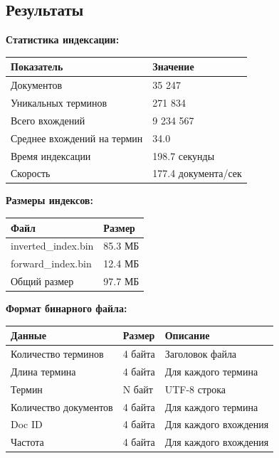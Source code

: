 \documentclass[a4paper, 12pt]{article}
\begin{document}
\subsection*{Результаты}
\textbf{Статистика индексации:}
\begin{table}[h]
\begin{tabular}{|l|l|}
\hline
\textbf{Показатель} & \textbf{Значение} \\ \hline
Документов & 35 247 \\ \hline
Уникальных терминов & 271 834 \\ \hline
Всего вхождений & 9 234 567 \\ \hline
Среднее вхождений на термин & 34.0 \\ \hline
Время индексации & 198.7 секунды \\ \hline
Скорость & 177.4 документа/сек \\ \hline
\end{tabular}
\end{table}

\textbf{Размеры индексов:}
\begin{table}[h]
\begin{tabular}{|l|l|}
\hline
\textbf{Файл} & \textbf{Размер} \\ \hline
inverted\_index.bin & 85.3 МБ \\ \hline
forward\_index.bin & 12.4 МБ \\ \hline
Общий размер & 97.7 МБ \\ \hline
\end{tabular}
\end{table}

\textbf{Формат бинарного файла:}
\begin{table}[h]
\begin{tabular}{|l|l|p{7cm}|}
\hline
\textbf{Данные} & \textbf{Размер} & \textbf{Описание} \\ \hline
Количество терминов & 4 байта & Заголовок файла \\ \hline
Длина термина & 4 байта & Для каждого термина \\ \hline
Термин & N байт & UTF-8 строка \\ \hline
Количество документов & 4 байта & Для каждого термина \\ \hline
Doc ID & 4 байта & Для каждого вхождения \\ \hline
Частота & 4 байта & Для каждого вхождения \\ \hline
\end{tabular}
\end{table}
\end{document}
